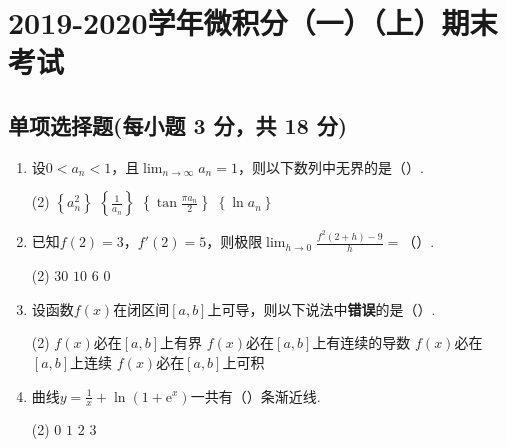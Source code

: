 \documentclass[../Main.tex]{subfiles}
\begin{document}
\chapter{2019-2020学年微积分（一）（上）期末考试}

\section{单项选择题(每小题 3 分，共 18 分)}
\begin{enumerate}
    \item 设$0<a_{n}<1$，且$\lim_{n\to\infty}a_{n}=1$，则以下数列中无界的是（\qquad）.

          \begin{tasks}[label=\textbf{\Alph*.}, label-width=1.5em, column-sep=1em](2)
              \task $\left\{a_{n}^{2}\right\}$
              \task $\left\{\frac{1}{a_{n}}\right\}$
              \task $\left\{\tan\frac{\pi a_{n}}{2}\right\}$
              \task $\left\{\ln a_{n}\right\}$
          \end{tasks}
          \vspace{1em}

    \item 已知$f(2)=3$，$f'(2)=5$，则极限$\lim_{h\to0}\frac{f^{2}(2+h)-9}{h}=$（\qquad）.

          \begin{tasks}[label=\textbf{\Alph*.}, label-width=1.5em, column-sep=1em](2)
              \task $30$
              \task $10$
              \task $6$
              \task $0$
          \end{tasks}
          \vspace{1em}

    \item 设函数$f(x)$在闭区间$[a,b]$上可导，则以下说法中\textbf{错误}的是（\qquad）.

          \begin{tasks}[label=\textbf{\Alph*.}, label-width=1.5em, column-sep=1em](2)
              \task $f(x)$必在$[a,b]$上有界
              \task $f(x)$必在$[a,b]$上有连续的导数
              \task $f(x)$必在$[a,b]$上连续
              \task $f(x)$必在$[a,b]$上可积
          \end{tasks}
          \vspace{1em}

    \item 曲线$y=\frac{1}{x}+\ln\left(1+\mathrm{e}^{x}\right)$一共有（\qquad）条渐近线.

          \begin{tasks}[label=\textbf{\Alph*.}, label-width=1.5em, column-sep=1em](2)
              \task $0$
              \task $1$
              \task $2$
              \task $3$
          \end{tasks}
          \vspace{1em}


\end{enumerate}
\end{document}
